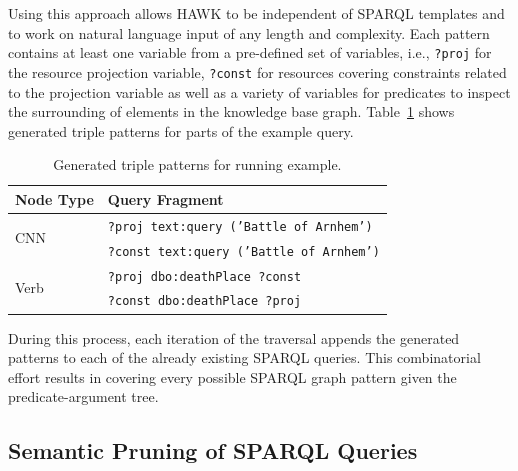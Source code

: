 Using this approach allows HAWK to be independent of SPARQL templates %
and to work on natural language input of any length and complexity.
Each pattern contains at least one variable from a pre-defined set of variables, i.e., \texttt{?proj} for the resource projection variable, \texttt{?const} for resources covering constraints related to the projection variable as well as a variety of variables for predicates to inspect the surrounding of elements in the knowledge base graph. 
Table~\ref{tab:triple_patterns_example} shows generated triple patterns for parts of the example query.
\begin{table}[htb!]
\centering
\caption{Generated triple patterns for running example.}
\begin{tabular}{l@{\quad}l}
\toprule
\textbf{Node Type} & \textbf{Query Fragment} \\
\midrule
\multirow{2}{*}{CNN} & \texttt{?proj text:query ('Battle of Arnhem')} \\
& \texttt{?const text:query ('Battle of Arnhem')} \\
\midrule
\multirow{2}{*}{Verb} & \texttt{?proj dbo:deathPlace ?const} \\
 & \texttt{?const dbo:deathPlace ?proj} \\
\bottomrule
\end{tabular}

\label{tab:triple_patterns_example}
\end{table}



During this process, each iteration of the traversal appends the generated patterns to each of the already existing SPARQL queries. 
This combinatorial effort results in covering every possible SPARQL graph pattern given the predicate-argument tree.



\subsection{Semantic Pruning of SPARQL Queries}

